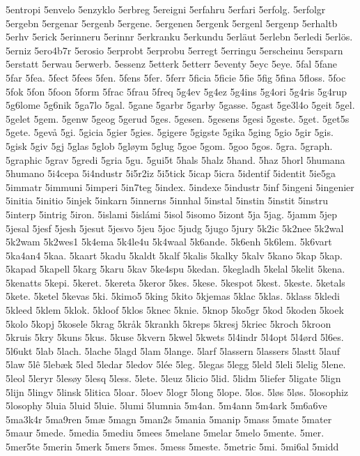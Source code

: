 5entropi
5envelo
5enzyklo
5erbreg
5ereigni
5erfahru
5erfari
5erfolg.
5erfolgr
5ergebn
5ergenar
5ergenb
5ergene.
5ergenen
5ergenk
5ergenl
5ergenp
5erhaltb
5erhv
5erick
5erinneru
5erinnr
5erkranku
5erkundu
5erläut
5erlebn
5erledi
5erlös.
5erniz
5ero4b7r
5erosio
5erprobt
5erprobu
5erregt
5erringu
5erscheinu
5ersparn
5erstatt
5erwau
5erwerb.
5essenz
5etterk
5etterr
5eventy
5eyc
5eye.
5fal
5fane
5far
5fea.
5fect
5fees
5fen.
5fens
5fer.
5ferr
5ficia
5ficie
5fie
5fig
5fina
5floss.
5foc
5fok
5fon
5foon
5form
5frac
5frau
5freq
5g4ev
5g4ez
5g4ins
5g4ori
5g4ris
5g4rup
5g6lome
5g6nik
5ga7lo
5gal.
5gane
5garbr
5garby
5gasse.
5gast
5ge3l4o
5geit
5gel.
5gelet
5gem.
5genw
5geog
5gerud
5ges.
5gesen.
5gesens
5gesi
5geste.
5get.
5get5s
5gete.
5gevå
5gi.
5gicia
5gier
5gies.
5gigere
5gigste
5gika
5ging
5gio
5gir
5gis.
5gisk
5giv
5gj
5glas
5glob
5gløym
5glug
5goe
5gom.
5goo
5gos.
5gra.
5graph.
5graphic
5grav
5gredi
5gria
5gu.
5gui5t
5hals
5halz
5hand.
5haz
5horl
5humana
5humano
5i4cepa
5i4ndustr
5i5r2iz
5i5tick
5icap
5icra
5identif
5identit
5ie5ga
5immatr
5immuni
5imperi
5in7teg
5index.
5indexe
5industr
5inf
5ingeni
5ingenier
5initia
5initio
5injek
5inkarn
5innerns
5innhal
5instal
5instin
5instit
5instru
5interp
5intrig
5iron.
5islami
5islámi
5isol
5isomo
5izont
5ja
5jag.
5jamm
5jep
5jesal
5jesf
5jesh
5jesut
5jesvo
5jeu
5joc
5judg
5jugo
5jury
5k2ic
5k2nee
5k2wal
5k2wam
5k2wes1
5k4ema
5k4le4u
5k4waal
5k6ande.
5k6enh
5k6lem.
5k6vart
5ka4an4
5kaa.
5kaart
5kadu
5kaldt
5kalf
5kalis
5kalky
5kalv
5kano
5kap
5kap.
5kapad
5kapell
5karg
5karu
5kav
5ke4spu
5kedan.
5kegladh
5kelal
5kelit
5kena.
5kenatts
5kepi.
5keret.
5kereta
5keror
5kes.
5kese.
5kespot
5kest.
5keste.
5ketals
5kete.
5ketel
5kevas
5ki.
5kimo5
5king
5kito
5kjemas
5klac
5klas.
5klass
5kledi
5kleed
5klem
5klok.
5kloof
5klos
5knec
5knie.
5knop
5ko5gr
5kod
5koden
5koek
5kolo
5kopj
5kosele
5krag
5kråk
5krankh
5kreps
5kresj
5kriec
5kroch
5kroon
5kruis
5kry
5kuns
5kus.
5kuse
5kvern
5kwel
5kwets
5l4indr
5l4opt
5l4ørd
5l6es.
5l6ukt
5lab
5lach.
5lache
5lagd
5lam
5lange.
5larf
5lassern
5lassers
5lastt
5lauf
5law
5lê
5lebæk
5led
5ledar
5ledov
5lée
5leg.
5legas
5legg
5leld
5leli
5lelig
5lene.
5leol
5leryr
5lesøy
5lesq
5less.
5lete.
5leuz
5licio
5lid.
5lidm
5liefer
5ligate
5lign
5lijn
5lingv
5linsk
5litica
5loar.
5loev
5logr
5long
5lope.
5los.
5løs
5løs.
5losophiz
5losophy
5luia
5luid
5luie.
5lumi
5lumnia
5m4an.
5m4ann
5m4ark
5m6a6ve
5ma3k4r
5ma9ren
5mæ
5magn
5man2s
5mania
5manip
5mass
5mate
5mater
5maur
5mede.
5media
5mediu
5mees
5melane
5melar
5melo
5mente.
5mer.
5mer5te
5merin
5merk
5mers
5mes.
5mess
5meste.
5metric
5mi.
5mi6al
5midd
